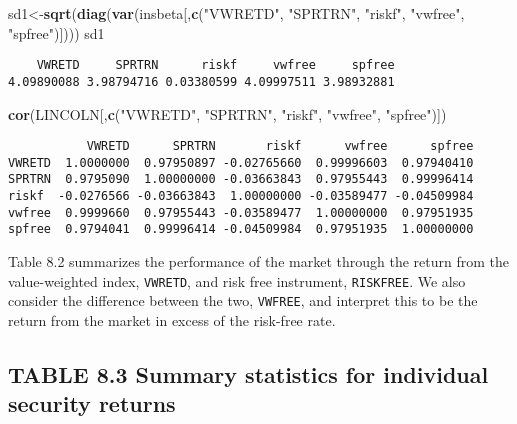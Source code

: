 \documentclass[]{book}
\newenvironment{Shaded}{\begin{snugshade}}{\end{snugshade}}
\newcommand{\KeywordTok}[1]{\textcolor[rgb]{0.13,0.29,0.53}{\textbf{#1}}}
\newcommand{\NormalTok}[1]{#1}
\newcommand{\StringTok}[1]{\textcolor[rgb]{0.31,0.60,0.02}{#1}}
\begin{document}
\begin{Shaded}
\begin{Highlighting}[]
\NormalTok{sd1<-}\KeywordTok{sqrt}\NormalTok{(}\KeywordTok{diag}\NormalTok{(}\KeywordTok{var}\NormalTok{(insbeta[,}\KeywordTok{c}\NormalTok{(}\StringTok{"VWRETD"}\NormalTok{, }\StringTok{"SPRTRN"}\NormalTok{, }\StringTok{"riskf"}\NormalTok{, }\StringTok{"vwfree"}\NormalTok{, }\StringTok{"spfree"}\NormalTok{)])))}
\NormalTok{sd1}
\end{Highlighting}
\end{Shaded}

\begin{verbatim}
    VWRETD     SPRTRN      riskf     vwfree     spfree 
4.09890088 3.98794716 0.03380599 4.09997511 3.98932881 
\end{verbatim}

\begin{Shaded}
\begin{Highlighting}[]
\KeywordTok{cor}\NormalTok{(LINCOLN[,}\KeywordTok{c}\NormalTok{(}\StringTok{"VWRETD"}\NormalTok{, }\StringTok{"SPRTRN"}\NormalTok{, }\StringTok{"riskf"}\NormalTok{, }\StringTok{"vwfree"}\NormalTok{, }\StringTok{"spfree"}\NormalTok{)])}
\end{Highlighting}
\end{Shaded}

\begin{verbatim}
           VWRETD      SPRTRN       riskf      vwfree      spfree
VWRETD  1.0000000  0.97950897 -0.02765660  0.99996603  0.97940410
SPRTRN  0.9795090  1.00000000 -0.03663843  0.97955443  0.99996414
riskf  -0.0276566 -0.03663843  1.00000000 -0.03589477 -0.04509984
vwfree  0.9999660  0.97955443 -0.03589477  1.00000000  0.97951935
spfree  0.9794041  0.99996414 -0.04509984  0.97951935  1.00000000
\end{verbatim}

Table 8.2 summarizes the performance of the market through the return from the value-weighted index, \texttt{VWRETD}, and risk free instrument, \texttt{RISKFREE}. We also consider the difference between the two, \texttt{VWFREE}, and interpret this to be the return from the market in excess of the risk-free rate.

\hypertarget{table-8.3-summary-statistics-for-individual-security-returns}{%
\subsection{TABLE 8.3 Summary statistics for individual security returns}\label{table-8.3-summary-statistics-for-individual-security-returns}}
\end{document}
